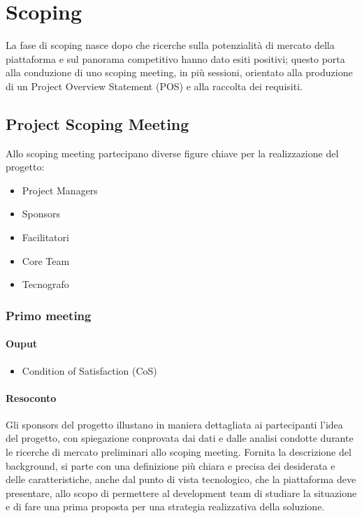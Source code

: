 \chapter{Scoping}

La fase di scoping nasce dopo che ricerche sulla potenzialità di mercato della piattaforma e sul panorama
competitivo hanno dato esiti positivi; questo porta alla conduzione di uno scoping meeting, in più sessioni, 
orientato alla produzione di un Project Overview Statement (POS) e alla raccolta dei requisiti.

\section{Project Scoping Meeting}
Allo scoping meeting partecipano diverse figure chiave per la realizzazione del progetto:
\begin{itemize}
    \item Project Managers
    \item Sponsors
    \item Facilitatori
    \item Core Team 
    \item Tecnografo
\end{itemize}

\subsection*{Primo meeting}
\subsubsection*{Ouput}
\begin{itemize}
    \item Condition of Satisfaction (CoS)
\end{itemize} 
\subsubsection*{Resoconto}
Gli sponsors del progetto illustano in maniera dettagliata ai partecipanti l'idea del progetto, con spiegazione 
conprovata dai dati e dalle analisi condotte durante le ricerche di mercato preliminari allo scoping meeting. 
Fornita la descrizione del background, si parte con una definizione più chiara e precisa dei desiderata e delle caratteristiche,
anche dal punto di vista tecnologico, che la piattaforma deve presentare, allo scopo di permettere al development team di studiare 
la situazione e di fare una prima proposta per una strategia realizzativa della soluzione.        
